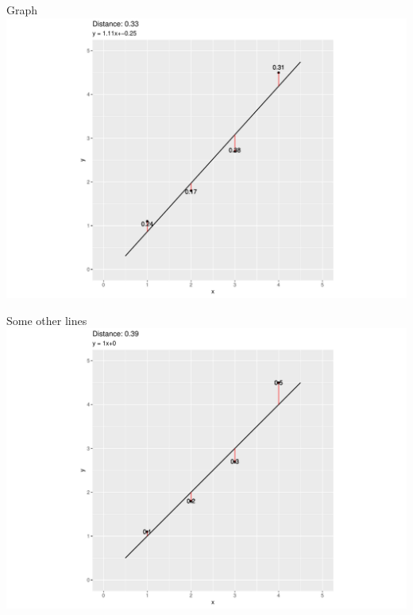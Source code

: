 \documentclass[
  ignorenonframetext,
]{beamer}
\begin{document}
\begin{frame}{Graph}
\protect\hypertarget{graph}{}
\includegraphics{1_files/figure-beamer/unnamed-chunk-8-1.pdf}
\end{frame}

\begin{frame}{Some other lines}
\protect\hypertarget{some-other-lines}{}
\includegraphics{1_files/figure-beamer/unnamed-chunk-9-1.pdf}
\end{frame}
\end{document}
